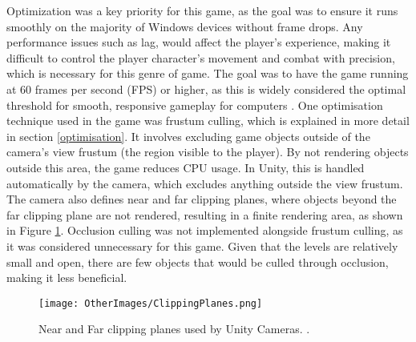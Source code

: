 \documentclass[10pt]{final_report}
\begin{document}
Optimization was a key priority for this game, as the goal was to ensure it runs smoothly on the majority of Windows devices without frame drops. Any performance issues such as lag, would affect the player’s experience, making it difficult to control the player character's movement and combat with precision, which is necessary for this genre of game. The goal was to have the game running at 60 frames per second (FPS) or higher, as this is widely considered the optimal threshold for smooth, responsive gameplay for computers \cite{Samuel2025}. 
\newline
One optimisation technique used in the game was frustum culling, which is explained in more detail in section \ref{optimisation}. It involves excluding game objects outside of the camera's view frustum (the region visible to the player). By not rendering objects outside this area, the game reduces CPU usage. In Unity, this is handled automatically by the camera, which excludes anything outside the view frustum. The camera also defines near and far clipping planes, where objects beyond the far clipping plane are not rendered, resulting in  a finite rendering area, as shown in Figure \ref{cullingarea}. Occlusion culling was not implemented alongside frustum culling, as it was considered unnecessary for this game. Given that the levels are relatively small and open, there are few objects that would be culled through occlusion, making it less beneficial.

\begin{figure}[H]
    \centering
    \texttt{[image: OtherImages/ClippingPlanes.png]}
    \caption{Near and Far clipping planes used by Unity Cameras. \cite{UnityFrustum}.}
    \label{cullingarea}
\end{figure}
\end{document}
